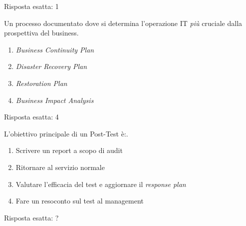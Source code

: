 \begin{Answer} [
  ref={bcdr7},
  number={7}
 ]
 
 \Question Risposta esatta: 1

\end{Answer}


\begin{Exercise} [
  title={},
  label={bcdr8}
 ]
 
 \Question Un processo documentato dove si determina l'operazione
 IT \emph{più} cruciale dalla prospettiva del business.
 \begin{enumerate}
   \item \textit{Business Continuity Plan}
   \item \textit{Disaster Recovery Plan}
   \item \textit{Restoration Plan}
   \item \textit{Business Impact Analysis}
 \end{enumerate}
  
\end{Exercise}

\begin{Answer} [
  ref={bcdr8},
  number={8}
 ]
 
 \Question Risposta esatta: 4
\end{Answer}




\begin{Exercise} [
  title={},
  label={bcdr9}
 ]
 
 \Question L'obiettivo principale di un Post-Test è:.
 \begin{enumerate}
   \item Scrivere un report a scopo di audit
   \item Ritornare al servizio normale
   \item Valutare l'efficacia del test e aggiornare il \textit{response
   plan}
   \item Fare un resoconto sul test al management 
 \end{enumerate}
  
\end{Exercise}

\begin{Answer} [
  ref={bcdr9},
  number={9}
 ]
 
 \Question Risposta esatta: ?
\end{Answer}

